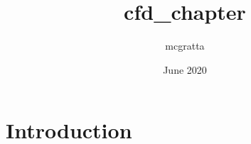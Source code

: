\documentclass{article}
\title{cfd_chapter}
\author{mcgratta }
\date{June 2020}
\begin{document}
\maketitle

\section{Introduction}
\end{document}
